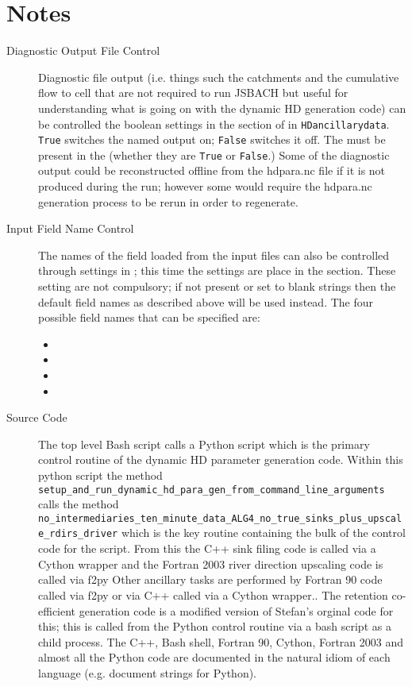 \documentclass{article}
\begin{document}
\section{Notes} \label{section-notes}
\begin{description}
\item[Diagnostic Output File Control] Diagnostic file output (i.e. things such the catchments and the cumulative flow to cell that are not required to run JSBACH but useful for understanding what is going on with the dynamic HD generation code)  can be controlled the boolean settings in the  section of  in \texttt{HDancillarydata}. \texttt{True} switches the named output on; \texttt{False} switches it off. The   must be present in the  (whether they are \texttt{True} or \texttt{False}.) Some of the diagnostic output could be reconstructed offline from the hdpara.nc file if it is not produced during the run; however some would require the hdpara.nc generation process to be rerun in order to regenerate.
\item[Input Field Name Control] The names of the field loaded from the input files can also be controlled through settings in ; this time the settings are place in the  section. These setting are not compulsory; if not present or set to blank strings then the default field names as described above will be used instead. The four possible field names that can be specified are:
\begin{itemize}
\item {}
\item {}
\item {}
\item {}
\end{itemize}
\item[Source Code] The top level Bash script calls a Python script which is the primary control routine of the dynamic HD parameter generation code. Within this python script the method  \lstinline[style=bash_input]{setup_and_run_dynamic_hd_para_gen_from_command_line_arguments} calls the method\\  \lstinline[style=bash_input]{no_intermediaries_ten_minute_data_ALG4_no_true_sinks_plus_upscale_rdirs_driver} which is the key routine containing the bulk of the control code for the script.  From this the C++ sink filing code is called via a Cython wrapper and the Fortran 2003 river direction upscaling code is called via f2py Other ancillary tasks are performed by Fortran 90 code called via f2py or via C++ called via a Cython wrapper.. The retention co-efficient generation code is a modified version of Stefan's orginal code for this; this is called from the Python control routine via a bash script as a child process. The C++, Bash shell, Fortran 90, Cython, Fortran 2003 and almost all the Python code are documented in the natural idiom of each language (e.g. document strings for Python).

\end{description}
\end{document}
